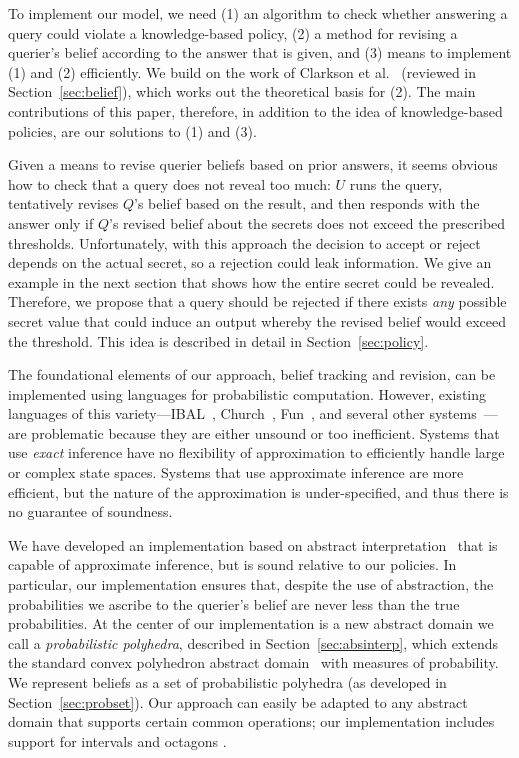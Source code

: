To implement our model, we need (1) an algorithm to check whether
answering a query could violate a knowledge-based policy, (2) a method
for revising a querier's belief according to the answer that is given,
and (3) means to implement (1) and (2) efficiently.  We build on the
work of Clarkson et al.~\cite{clarkson09quantifying} (reviewed in
Section~\ref{sec:belief}), which works out the theoretical basis for
(2).  The main contributions of this
paper, therefore, in addition to the idea of knowledge-based policies,
are our solutions to (1) and (3). 

Given a means to revise querier beliefs based on prior answers, it
seems obvious how to check that a query does not reveal too much: $U$
runs the query, tentatively revises $Q$'s belief based on the result,
and then responds with the answer only if $Q$'s revised belief about
the secrets does not exceed the prescribed thresholds.  Unfortunately,
with this approach the decision to accept or reject depends on the actual secret,
so a rejection could leak information.  We give an example in the next
section that shows how the entire secret could be revealed.
Therefore, we propose that a query should be rejected if there exists
\emph{any} possible secret value that could induce an output whereby
the revised belief would exceed the threshold.  This idea is described
in detail in Section~\ref{sec:policy}.

The foundational elements of our approach, belief tracking and
revision, can be implemented using languages for probabilistic
computation.  However, existing languages of this
variety---IBAL~\cite{pfeffer07ibal}, Church~\cite{goodman08church},
Fun~\cite{borgstrom11measure}, and several other
systems~\cite{radul07probscheme,park08sampling,kiselyov09embedded,milch05blog}---
are problematic because they are either unsound or too inefficient.
Systems that use \emph{exact} inference have no flexibility of approximation to efficiently handle large or complex state
spaces. %
Systems that use approximate inference are more
efficient, but the nature of the approximation is under-specified, and
thus there is no guarantee of soundness.

We have developed an implementation based on abstract
interpretation~\cite{CousotCousot77} that is capable of approximate
inference, but is sound relative to our policies.  In particular, our
implementation ensures that, despite the use of abstraction, the
probabilities we ascribe to the querier's belief are never less than
the true probabilities.  At the center of our implementation is a new
abstract domain we call a 
\emph{probabilistic polyhedra}, described in
Section~\ref{sec:absinterp}, which extends the standard convex
polyhedron abstract domain~\cite{CousotHalbwachs78-POPL} with measures
of probability.  We represent beliefs as a set of probabilistic
polyhedra (as developed in Section~\ref{sec:probset}). Our approach
can easily be adapted to any abstract
domain that supports certain common operations; our implementation
includes support for intervals
\cite{cousot76static} and octagons \cite{mine01octagon}.

